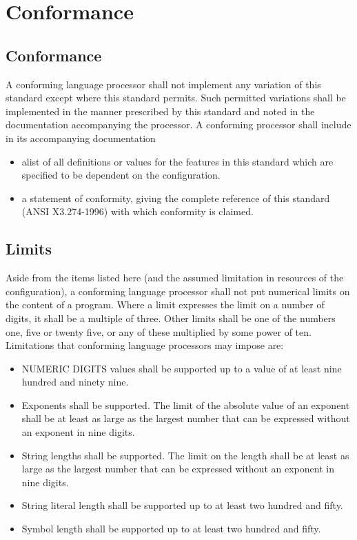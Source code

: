 \chapter{Conformance}\label{conformance}

\section{Conformance}\label{conformance-1}

A conforming language processor shall not implement any variation of
this standard except where this standard permits. Such permitted
variations shall be implemented in the manner prescribed by this
standard and noted in the documentation accompanying the processor. A
conforming processor shall include in its accompanying documentation

\begin{itemize}
\item
  alist of all definitions or values for the features in this standard
  which are specified to be dependent on the configuration.
\item
  a statement of conformity, giving the complete reference of this
  standard (ANSI X3.274-1996) with which conformity is claimed.
\end{itemize}

\section{Limits}\label{limits}

Aside from the items listed here (and the assumed limitation in
resources of the configuration), a conforming language processor shall
not put numerical limits on the content of a program. Where a limit
expresses the limit on a number of digits, it shall be a multiple of
three. Other limits shall be one of the numbers one, five or twenty
five, or any of these multiplied by some power of ten. Limitations that
conforming language processors may impose are:

\begin{itemize}
\item
  NUMERIC DIGITS values shall be supported up to a value of at least
  nine hundred and ninety nine.
\item
  Exponents shall be supported. The limit of the absolute value of an
  exponent shall be at least as large as the largest number that can be
  expressed without an exponent in nine digits.
\item
  String lengths shall be supported. The limit on the length shall be at
  least as large as the largest number that can be expressed without an
  exponent in nine digits.
\item
  String literal length shall be supported up to at least two hundred
  and fifty.
\item
  Symbol length shall be supported up to at least two hundred and fifty.
\end{itemize}
